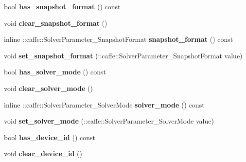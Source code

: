 \begin{DoxyCompactItemize}
bool {\bfseries has\+\_\+snapshot\+\_\+format} () const
\item 
\mbox{\label{classcaffe_1_1_solver_parameter_a986443cb679e9672ffae7b7c92e6bec6}} 
void {\bfseries clear\+\_\+snapshot\+\_\+format} ()
\item 
\mbox{\label{classcaffe_1_1_solver_parameter_aa98c1d412f91178a6d68346e9200579d}} 
inline \+::caffe\+::\+Solver\+Parameter\+\_\+\+Snapshot\+Format {\bfseries snapshot\+\_\+format} () const
\item 
\mbox{\label{classcaffe_1_1_solver_parameter_a4e9100661612d6a24f5bc60db10a25ba}} 
void {\bfseries set\+\_\+snapshot\+\_\+format} (\+::caffe\+::\+Solver\+Parameter\+\_\+\+Snapshot\+Format value)
\item 
\mbox{\label{classcaffe_1_1_solver_parameter_a3e1717037cb81128d62acbc8546a704b}} 
bool {\bfseries has\+\_\+solver\+\_\+mode} () const
\item 
\mbox{\label{classcaffe_1_1_solver_parameter_a11ae2631505425086cb3a09833152708}} 
void {\bfseries clear\+\_\+solver\+\_\+mode} ()
\item 
\mbox{\label{classcaffe_1_1_solver_parameter_a92e5cb7f3ebc435b760647bdd233f602}} 
inline \+::caffe\+::\+Solver\+Parameter\+\_\+\+Solver\+Mode {\bfseries solver\+\_\+mode} () const
\item 
\mbox{\label{classcaffe_1_1_solver_parameter_a1929786a7f10ec9c77cdea5b89ba26e0}} 
void {\bfseries set\+\_\+solver\+\_\+mode} (\+::caffe\+::\+Solver\+Parameter\+\_\+\+Solver\+Mode value)
\item 
\mbox{\label{classcaffe_1_1_solver_parameter_a05edd682c576006366edf832f2bf859e}} 
bool {\bfseries has\+\_\+device\+\_\+id} () const
\item 
\mbox{\label{classcaffe_1_1_solver_parameter_a004536bcdae2cdfe28b7ff8a2be8d656}} 
void {\bfseries clear\+\_\+device\+\_\+id} ()
\item 

\end{DoxyCompactItemize}
